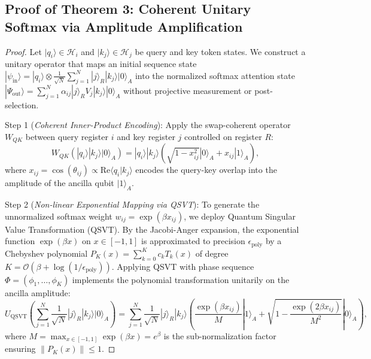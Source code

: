 \documentclass{article}
\begin{document}
\subsection{Proof of Theorem 3: Coherent Unitary Softmax via Amplitude Amplification}
\label{sec:proof_thm3}

\begin{proof}
Let $|q_i\rangle \in \mathcal{H}_i$ and $|k_j\rangle \in \mathcal{H}_j$ be query and key token states. We construct a unitary operator that maps an initial sequence state $|\psi_{\mathrm{in}}\rangle = |q_i\rangle \otimes \frac{1}{\sqrt{N}}\sum_{j=1}^N |j\rangle_R |k_j\rangle |0\rangle_A$ into the normalized softmax attention state $|\Psi_{\mathrm{out}}\rangle = \sum_{j=1}^N \alpha_{ij} |j\rangle_R V_j |k_j\rangle |0\rangle_A$ without projective measurement or post-selection.

Step 1 (\emph{Coherent Inner-Product Encoding}): Apply the swap-coherent operator $W_{QK}$ between query register $i$ and key register $j$ controlled on register $R$:
\begin{equation}
W_{QK} \left( |q_i\rangle |k_j\rangle |0\rangle_A \right) = |q_i\rangle |k_j\rangle \left( \sqrt{1 - x_{ij}^2} |0\rangle_A + x_{ij} |1\rangle_A \right),
\end{equation}
where $x_{ij} = \cos(\theta_{ij}) \propto \mathrm{Re}\langle q_i | k_j \rangle$ encodes the query-key overlap into the amplitude of the ancilla qubit $|1\rangle_A$.

Step 2 (\emph{Non-linear Exponential Mapping via QSVT}): To generate the unnormalized softmax weight $w_{ij} = \exp(\beta x_{ij})$, we deploy Quantum Singular Value Transformation (QSVT). By the Jacobi-Anger expansion, the exponential function $\exp(\beta x)$ on $x \in [-1, 1]$ is approximated to precision $\epsilon_{\mathrm{poly}}$ by a Chebyshev polynomial $P_K(x) = \sum_{k=0}^K c_k T_k(x)$ of degree $K = \mathcal{O}(\beta + \log(1/\epsilon_{\mathrm{poly}}))$. Applying QSVT with phase sequence $\Phi = (\phi_1, \dots, \phi_K)$ implements the polynomial transformation unitarily on the ancilla amplitude:
\begin{equation}
U_{\mathrm{QSVT}} \left( \sum_{j=1}^N \frac{1}{\sqrt{N}} |j\rangle_R |k_j\rangle |0\rangle_A \right) = \sum_{j=1}^N \frac{1}{\sqrt{N}} |j\rangle_R |k_j\rangle \left( \frac{\exp(\beta x_{ij})}{M} |1\rangle_A + \sqrt{1 - \frac{\exp(2\beta x_{ij})}{M^2}} |0\rangle_A \right),
\end{equation}
where $M = \max_{x \in [-1, 1]} \exp(\beta x) = e^\beta$ is the sub-normalization factor ensuring $\|P_K(x)\| \le 1$.


\end{proof}
\end{document}
